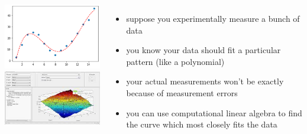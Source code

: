 \documentclass[handout]{beamer}
\begin{document}
\begin{frame}{}
 \begin{columns}
    \centering
             \includegraphics[width=\linewidth]{img/curve-fitting.png}
	     \\\vspace{.3in}
             \includegraphics[width=\linewidth]{img/curve-fitting-2d.jpg}
    \begin{itemize}
      \item suppose you experimentally measure a bunch of data
      \item you know your data should fit a particular pattern (like a polynomial)
      \item your actual measurements won't be exactly because of measurement errors
      \item you can use computational linear algebra to find the curve which most closely fits the data
    \end{itemize}
 \end{columns} 
\end{frame}
\end{document}
